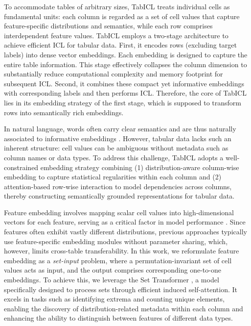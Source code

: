 \documentclass{article}
\theoremstyle{plain}
\theoremstyle{definition}
\theoremstyle{remark}
\begin{document}
To accommodate tables of arbitrary sizes, TabICL treats individual cells as fundamental units: each column is regarded as a set of cell values that capture feature-specific distributions and semantics, while each row comprises interdependent feature values. TabICL employs a two-stage architecture to achieve efficient ICL for tabular data. First, it encodes rows (excluding target labels) into dense vector embeddings. Each embedding is designed to capture the entire table information. This stage effectively collapses the column dimension to substantially reduce computational complexity and memory footprint for subsequent ICL. Second, it combines these compact yet informative embeddings with corresponding labels and then performs ICL. Therefore, the core of TabICL lies in its embedding strategy of the first stage, which is supposed to transform rows into semantically rich embeddings.

In natural language, words often carry clear semantics and are thus naturally associated to informative embeddings \cite{mikolovEfficientEstimationWord2013}. However, tabular data lacks such an inherent structure: cell values can be ambiguous without metadata such as column names or data types. To address this challenge, TabICL adopts a well-constrained embedding strategy combining (1) distribution-aware column-wise embedding to capture statistical regularities within each column and (2) attention-based row-wise interaction to model dependencies across columns, thereby constructing semantically grounded representations for tabular data.

Feature embedding involves mapping scalar cell values into high-dimensional vectors for each feature, serving as a critical factor in model performance \cite{gorishniyEmbeddingsNumericalFeatures2022}. Since features often exhibit vastly different distributions, previous approaches typically use feature-specific embedding modules without parameter sharing, which, however, limits cross-table transferability. In this work, we reformulate feature embedding as a \emph{set-input} problem, where a permutation-invariant set of cell values acts as input, and the output comprises corresponding one-to-one embeddings. To achieve this, we leverage the Set Transformer \cite{leeSetTransformerFramework2019}, a model specifically designed to process sets through efficient induced self-attention. It excels in tasks such as identifying extrema and counting unique elements, enabling the discovery of distribution-related metadata within each column and enhancing the ability to distinguish between features of different data types.
\end{document}
